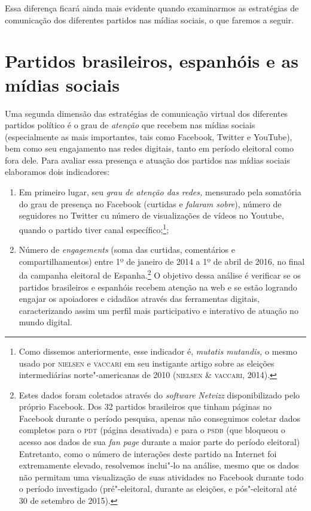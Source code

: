 Essa diferença ficará ainda mais evidente quando examinarmos as
estratégias de comunicação dos diferentes partidos nas mídias sociais, o
que faremos a seguir.

\section{Partidos brasileiros, espanhóis e as mídias sociais}

Uma segunda dimensão das estratégias de comunicação virtual dos
diferentes partidos político é o grau de \emph{atenção} que recebem nas
mídias sociais (especialmente as mais importantes, tais como Facebook,
Twitter e YouTube), bem como seu engajamento nas redes digitais, tanto
em período eleitoral como fora dele. Para avaliar essa presença e
atuação dos partidos nas mídias sociais elaboramos dois indicadores: 

\begin{enumerate}

\item
Em primeiro lugar, seu \emph{grau de atenção das redes,} mensurado pela
somatória do grau de presença no Facebook (curtidas e \textit{falaram sobre}), 
número de seguidores no Twitter cu número de visualizações de vídeos no
Youtube, quando o partido tiver canal específico;\footnote{Como dissemos
  anteriormente, esse indicador é, \emph{mutatis mutandis,} o mesmo
  usado por \textsc{nielsen} e \textsc{vaccari} em seu instigante artigo sobre as eleições
  intermediárias norte"-americanas de 2010 (\textsc{nielsen \& vaccari}, 2014).};

\item Número de \emph{engagements} (soma das curtidas, comentários e
compartilhamentos) entre 1º de janeiro de 2014 a 1º de abril de 2016, no
final da campanha eleitoral de Espanha.\footnote{Estes dados foram
  coletados através do \emph{\emph{software}} \emph{Netvizz} disponibilizado pelo
  próprio Facebook. Dos 32 partidos brasileiros que tinham páginas no
  Facebook durante o período pesquisa, apenas não conseguimos coletar
  dados completos para o \textsc{pdt} (página desativada) e para o \textsc{psdb} (que
  bloqueou o acesso aos dados de sua \emph{fan page} durante a maior
  parte do período eleitoral) Entretanto, como o número de interações
  deste partido na Internet foi extremamente elevado, resolvemos
  inclui"-lo na análise, mesmo que os dados não permitam uma visualização
  de suas atividades no Facebook durante todo o período investigado
  (pré"-eleitoral, durante as eleições, e pós"-eleitoral até 30 de
  setembro de 2015).} O objetivo dessa análise é verificar se os
partidos brasileiros e espanhóis recebem atenção na web e se estão
logrando engajar os apoiadores e cidadãos através das ferramentas
digitais, caracterizando assim um perfil mais participativo e interativo
de atuação no mundo digital.

\end{enumerate}

